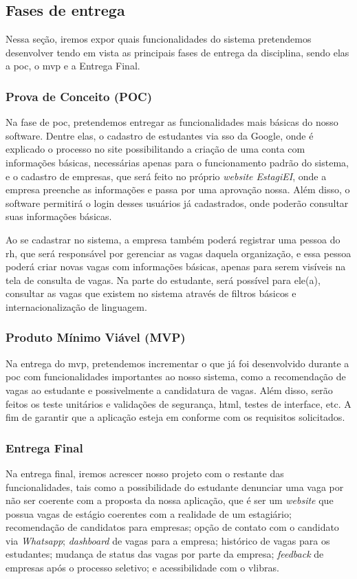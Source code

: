\subsection{Fases de entrega}

Nessa seção, iremos expor quais funcionalidades do sistema pretendemos desenvolver tendo em vista as principais fases de entrega da disciplina, sendo elas a \ac{poc}, o \ac{mvp} e a Entrega Final.

\subsubsection{Prova de Conceito (POC)}

Na fase de \ac{poc}, pretendemos entregar as funcionalidades mais básicas do nosso software. Dentre elas, o cadastro de estudantes via \ac{sso} da Google, onde é explicado o processo no site possibilitando a criação de uma conta com informações básicas, necessárias apenas para o funcionamento padrão do sistema, e o cadastro de empresas, que será feito no próprio \emph{website EstagiEI}, onde a empresa preenche as informações e passa por uma aprovação nossa. Além disso, o software permitirá o login desses usuários já cadastrados, onde poderão consultar suas informações básicas.

Ao se cadastrar no sistema, a empresa também poderá registrar uma pessoa do \ac{rh}, que será responsável por gerenciar as vagas daquela organização, e essa pessoa poderá criar novas vagas com informações básicas, apenas para serem visíveis na tela de consulta de vagas. Na parte do estudante, será possível para ele(a), consultar as vagas que existem no sistema através de filtros básicos e internacionalização de linguagem.

\subsubsection{Produto Mínimo Viável (MVP)}

Na entrega do \ac{mvp}, pretendemos incrementar o que já foi desenvolvido durante a \ac{poc} com funcionalidades importantes ao nosso sistema, como a recomendação de vagas ao estudante e possivelmente a candidatura de vagas. Além disso, serão feitos os teste unitários e validações de segurança, \ac{html}, testes de interface, etc. A fim de garantir que a aplicação esteja em conforme com os requisitos solicitados.

\subsubsection{Entrega Final}

Na entrega final, iremos acrescer nosso projeto com o restante das funcionalidades, tais como a possibilidade do estudante denunciar uma vaga por não ser coerente com a proposta da nossa aplicação, que é ser um \emph{website} que possua vagas de estágio coerentes com a realidade de um estagiário; recomendação de candidatos para empresas; opção de contato com o candidato via \emph{Whatsapp}; \emph{dashboard} de vagas para a empresa; histórico de vagas para os estudantes; mudança de status das vagas por parte da empresa; \emph{feedback} de empresas após o processo seletivo; e acessibilidade com o \gls{vlibras}.